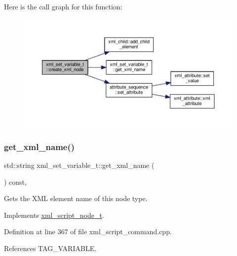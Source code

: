 Here is the call graph for this function\+:
\nopagebreak
\begin{figure}[H]
\begin{center}
\leavevmode
\includegraphics[width=350pt]{dc/db4/classxml__set__variable__t_a95b663fe068ba84695f348fb6cea929b_cgraph}
\end{center}
\end{figure}
\mbox{\label{classxml__set__variable__t_aa247f1465847c3ee2ec8f7200e2ac401}} 
\subsubsection{\texorpdfstring{get\+\_\+xml\+\_\+name()}{get\_xml\_name()}}
{\footnotesize\ttfamily std\+::string xml\+\_\+set\+\_\+variable\+\_\+t\+::get\+\_\+xml\+\_\+name (\begin{DoxyParamCaption}{ }\end{DoxyParamCaption}) const\hspace{0.3cm}{\ttfamily [override]}, {\ttfamily [virtual]}}



Gets the X\+ML element name of this node type. 



Implements \hyperlink{classxml__script__node__t_af5815fab8924e5e4f47ba1b7266b6cb8}{xml\+\_\+script\+\_\+node\+\_\+t}.



Definition at line 367 of file xml\+\_\+script\+\_\+command.\+cpp.



References T\+A\+G\+\_\+\+V\+A\+R\+I\+A\+B\+LE.



